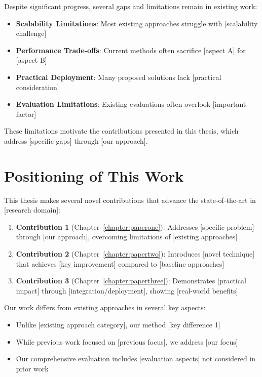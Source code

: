 Despite significant progress, several gaps and limitations remain in existing work:

\begin{itemize}
    \item \textbf{Scalability Limitations}: Most existing approaches struggle with [scalability challenge]
    \item \textbf{Performance Trade-offs}: Current methods often sacrifice [aspect A] for [aspect B]
    \item \textbf{Practical Deployment}: Many proposed solutions lack [practical consideration]
    \item \textbf{Evaluation Limitations}: Existing evaluations often overlook [important factor]
\end{itemize}

These limitations motivate the contributions presented in this thesis, which address [specific gaps] through [our approach].

\section{Positioning of This Work}

This thesis makes several novel contributions that advance the state-of-the-art in [research domain]:

\begin{enumerate}
    \item \textbf{Contribution 1} (Chapter~\ref{chapter:paperone}): Addresses [specific problem] through [our approach], overcoming limitations of [existing approaches]
    
    \item \textbf{Contribution 2} (Chapter~\ref{chapter:papertwo}): Introduces [novel technique] that achieves [key improvement] compared to [baseline approaches]
    
    \item \textbf{Contribution 3} (Chapter~\ref{chapter:paperthree}): Demonstrates [practical impact] through [integration/deployment], showing [real-world benefits]
\end{enumerate}

Our work differs from existing approaches in several key aspects:
\begin{itemize}
    \item Unlike [existing approach category], our method [key difference 1]
    \item While previous work focused on [previous focus], we address [our focus]
    \item Our comprehensive evaluation includes [evaluation aspects] not considered in prior work
\end{itemize}

